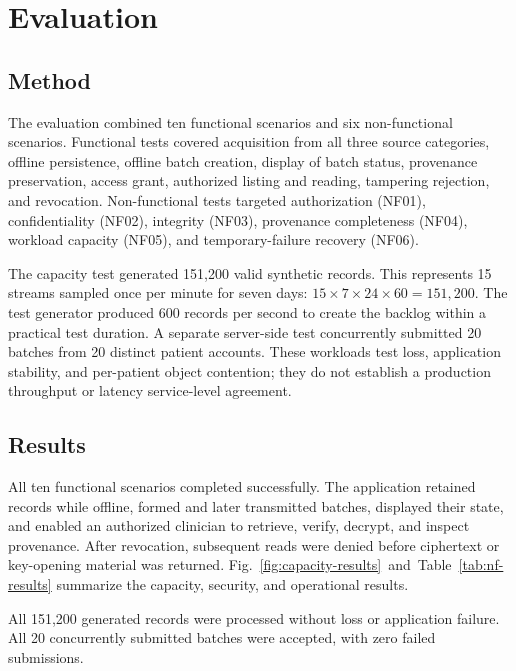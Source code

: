 \section{Evaluation}

\subsection{Method}

The evaluation combined ten functional scenarios and six non-functional scenarios.
Functional tests covered acquisition from all three source categories, offline persistence, offline batch creation, display of batch status, provenance preservation, access grant, authorized listing and reading, tampering rejection, and revocation.
Non-functional tests targeted authorization (NF01), confidentiality (NF02), integrity (NF03), provenance completeness (NF04), workload capacity (NF05), and temporary-failure recovery (NF06).

The capacity test generated 151,200 valid synthetic records.
This represents 15 streams sampled once per minute for seven days:
\(15 \times 7 \times 24 \times 60 = 151{,}200\).
The test generator produced 600 records per second to create the backlog within a practical test duration.
A separate server-side test concurrently submitted 20 batches from 20 distinct patient accounts.
These workloads test loss, application stability, and per-patient object contention; they do not establish a production throughput or latency service-level agreement.

\subsection{Results}

All ten functional scenarios completed successfully.
The application retained records while offline, formed and later transmitted batches, displayed their state, and enabled an authorized clinician to retrieve, verify, decrypt, and inspect provenance.
After revocation, subsequent reads were denied before ciphertext or key-opening material was returned.
\mbox{Fig.~\ref{fig:capacity-results} and Table~\ref{tab:nf-results}} summarize the capacity, security, and operational results.

All 151,200 generated records were processed without loss or application failure.
All 20 concurrently submitted batches were accepted, with zero failed submissions.

